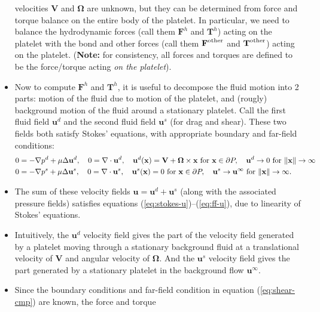 \documentclass{article}
\newcommand{\tn}{\textnormal}
\newcommand{\vect}[1]{\boldsymbol{\mathbf{#1}}}
\begin{document}
\begin{itemize}
  velocities $\vect{V}$ and $\vect{\Omega}$ are unknown, but they can
  be determined from force and torque balance on the entire body of
  the platelet. In particular, we need to balance the hydrodynamic
  forces (call them $\vect{F}^h$ and $\vect{T}^h$) acting on the
  platelet with the bond and other forces (call them
  $\vect{F}^\tn{other}$ and $\vect{T}^\tn{other}$) acting on the
  platelet. (\textbf{Note:} for consistency, all forces and torques
  are defined to be the force/torque acting \emph{on the platelet}).
\item Now to compute $\vect{F}^h$ and $\vect{T}^h$, it is useful to decompose the
  fluid motion into 2 parts: motion of the fluid due to motion of the
  platelet, and (rougly) background motion of the fluid around a
  stationary platelet. Call the first fluid field $\vect{u}^d$
  and the second fluid field $\vect{u}^s$ (for drag and
  shear). These two fields both satisfy Stokes' equations, with
  appropriate boundary and far-field conditions:
  \begin{align}
    0 &= -\nabla p^d + \mu \Delta \vect{u}^d, \quad 0 = \nabla
        \cdot \vect{u}^d, \quad \vect{u}^d(\vect{x}) =
        \vect{V} + \vect{\Omega} \times \vect{x} \tn{
        for } \vect{x} \in \partial P, \quad \vect{u}^d
        \rightarrow 0 \tn{ for } \|\mathbf{x}\| \rightarrow
        \infty \label{eq:static-cmp} \\ 
    0 &= -\nabla p^s + \mu \Delta \vect{u}^s, \quad 0 = \nabla
        \cdot \vect{u}^s, \quad \vect{u}^s(\vect{x}) =
        0 \tn{ for } \vect{x} \in \partial P, \quad
        \vect{u}^s \rightarrow \vect{u}^\infty \tn{ for }
        \|\mathbf{x}\| \rightarrow \infty. \label{eq:shear-cmp}
  \end{align}
\item The sum of these velocity fields
  $\vect{u} = \vect{u}^d + \vect{u}^s$ (along with the
  associated pressure fields) satisfies equations
  (\ref{eq:stokes-u})--(\ref{eq:ff-u}), due to linearity of Stokes'
  equations.
\item Intuitively, the $\vect{u}^d$ velocity field gives the part
  of the velocity field generated by a platelet moving through a
  stationary background fluid at a translational velocity of
  $\vect{V}$ and angular velocity of $\vect{\Omega}$. And the
  $\vect{u}^s$ velocity field gives the part generated by a
  stationary platelet in the background flow $\vect{u}^\infty$.
\item Since the boundary conditions and far-field condition in
  equation (\ref{eq:shear-cmp}) are known, the force and torque

\end{itemize}
\end{document}
